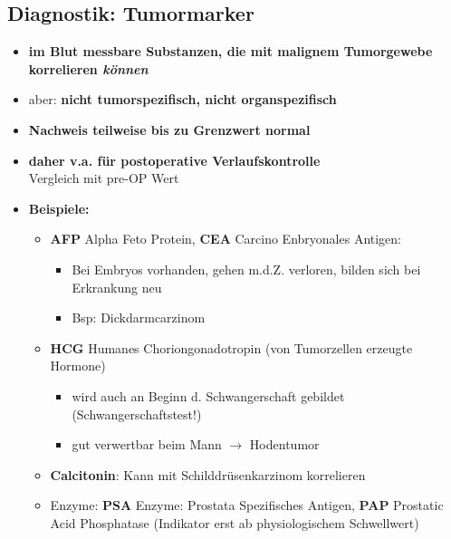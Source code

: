 	\subsection{Diagnostik: Tumormarker}
		\begin{itemize}
			\item \textbf{im Blut messbare Substanzen, die mit malignem
				Tumorgewebe korrelieren \emph{können}}
			\item aber: \textbf{nicht tumorspezifisch, nicht organspezifisch}
			\item \textbf{Nachweis teilweise bis zu Grenzwert normal}
			\item \textbf{daher v.a. für postoperative Verlaufskontrolle}\\
				Vergleich mit pre-OP Wert
			\item \textbf{Beispiele:}
				\begin{itemize}
					\item \textbf{AFP} Alpha Feto Protein, \textbf{CEA} Carcino Enbryonales Antigen:
						\begin{itemize}
							\item Bei Embryos vorhanden, gehen m.d.Z. verloren, bilden sich bei Erkrankung neu
							\item Bsp: Dickdarmcarzinom
						\end{itemize}
					\item \textbf{HCG} Humanes Choriongonadotropin (von Tumorzellen erzeugte Hormone)
						\begin{itemize}
							\item wird auch an Beginn d. Schwangerschaft gebildet (Schwangerschaftstest!)
							\item gut verwertbar beim Mann $\rightarrow$ Hodentumor
						\end{itemize}
					\item \textbf{Calcitonin}: Kann mit Schilddrüsenkarzinom korrelieren
					\item Enzyme: \textbf{PSA} Enzyme: Prostata Spezifisches Antigen, \textbf{PAP} Prostatic Acid Phosphatase (Indikator erst ab physiologischem Schwellwert)
				\end{itemize}
		\end{itemize}
